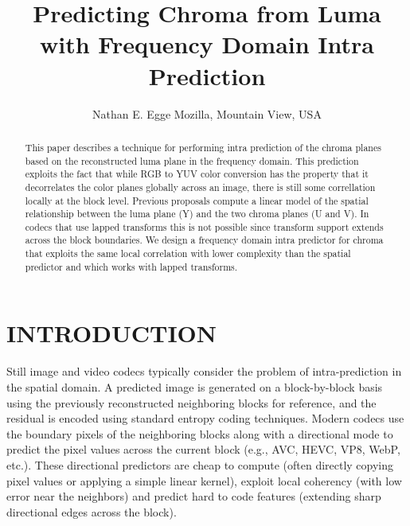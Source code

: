 \documentclass[a4paper]{spie}  %
\title{Predicting Chroma from Luma with Frequency Domain Intra Prediction}
\author{Nathan E. Egge
\skiplinehalf
Mozilla, Mountain View, USA
}
\begin{document}
 
  \maketitle 

\begin{abstract}
This paper describes a technique for performing intra prediction of the chroma
 planes based on the reconstructed luma plane in the frequency domain.
This prediction exploits the fact that while RGB to YUV color conversion has
 the property that it decorrelates the color planes globally across an image,
 there is still some correllation locally at the block level\cite{LeeCho09}.
Previous proposals compute a linear model of the spatial relationship between
 the luma plane (Y) and the two chroma planes (U and V)\cite{JCTVCB021}.
In codecs that use lapped transforms this is not possible since transform
 support extends across the block boundaries\cite{Tran2003}.
We design a frequency domain intra predictor for chroma that exploits the same
 local correlation with lower complexity than the spatial predictor and which
 works with lapped transforms.


\end{abstract}



\section{INTRODUCTION}
\label{sec:intro}  %

Still image and video codecs typically consider the problem of intra-prediction
 in the spatial domain.
A predicted image is generated on a block-by-block basis using the previously
 reconstructed neighboring blocks for reference, and the residual is encoded
 using standard entropy coding techniques.
Modern codecs use the boundary pixels of the neighboring blocks along with a
 directional mode to predict the pixel values across the current block (e.g.,
 AVC, HEVC, VP8, WebP, etc.).
These directional predictors are cheap to compute (often directly copying pixel
 values or applying a simple linear kernel), exploit local coherency (with low
 error near the neighbors) and predict hard to code features (extending sharp
 directional edges across the block).
\end{document}
